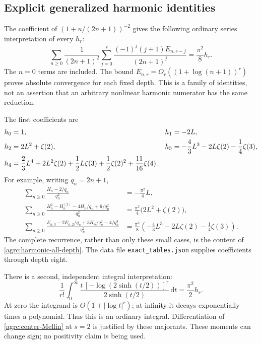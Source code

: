 \documentclass[11pt]{article}
\numberwithin{equation}{section}
\theoremstyle{definition}\newtheorem{definition}[theorem]{Definition}
\theoremstyle{remark}\newtheorem{remark}[theorem]{Remark}
\newcommand{\dd}{\,\mathrm d}
\begin{document}
\subsection{Explicit generalized harmonic identities}

The coefficient of $(1+u/(2n+1))^{-2}$ gives the following ordinary
series interpretation of every $h_r$:
\begin{equation}\label{agrc:harmonic-all-depth}
 \boxed{\displaystyle
 \sum_{n\geq0}\frac1{(2n+1)^2}
    \sum_{j=0}^r\frac{(-1)^j(j+1)E_{n,r-j}}{(2n+1)^j}
       =\frac{\pi^2}{8}h_r.}
\end{equation}
The $n=0$ terms are included. The bound
$E_{n,r}=O_r((1+\log(n+1))^r)$ proves absolute convergence for each
fixed depth. This is a family of identities, not an assertion that an
arbitrary nonlinear harmonic numerator has the same reduction.

The first coefficients are
\begin{align}
 h_0&=1,&h_1&=-2L,\notag\\
 h_2&=2L^2+\zeta(2),&
 h_3&=-\frac43L^3-2L\zeta(2)-\frac14\zeta(3),\notag\\
 h_4&=\frac23L^4+2L^2\zeta(2)+\frac12L\zeta(3)
                       +\frac12\zeta(2)^2+\frac{11}{16}\zeta(4).
 \label{agrc:h-examples}
\end{align}
For example, writing $q_n=2n+1$,
\begin{align}
 \sum_{n\geq0}\frac{H_n-2/q_n}{q_n^2}
   &=-\frac{\pi^2}{4}L,\label{agrc:h-linear}\\
 \sum_{n\geq0}\frac{H_n^2-H_n^{(2)}-4H_n/q_n+6/q_n^2}{q_n^2}
   &=\frac{\pi^2}{4}\bigl(2L^2+\zeta(2)\bigr),
 \label{agrc:h-quadratic}\\
 \sum_{n\geq0}\frac{E_{n,3}-2E_{n,2}/q_n+3H_n/q_n^2-4/q_n^3}{q_n^2}
   &=\frac{\pi^2}{8}\left(-\frac43L^3-2L\zeta(2)-\frac14\zeta(3)\right).
 \label{agrc:h-cubic}
\end{align}
The complete recurrence, rather than only these small cases, is the
content of \eqref{agrc:harmonic-all-depth}. The data file
\texttt{exact\_tables.json} supplies coefficients through depth eight.

There is a second, independent integral interpretation:
\begin{equation}\label{agrc:log-sinh-moments}
 \frac1{r!}\int_0^\infty
 \frac{t\,[-\log(2\sinh(t/2))]^r}{2\sinh(t/2)}\dd t
     =\frac{\pi^2}{2}h_r.
\end{equation}
At zero the integrand is $O(1+|\log t|^r)$; at infinity it decays
exponentially times a polynomial. Thus this is an ordinary integral.
Differentiation of \eqref{agrc:center-Mellin} at $s=2$ is justified
by these majorants. These moments can change sign; no positivity claim
is being used.
\end{document}
